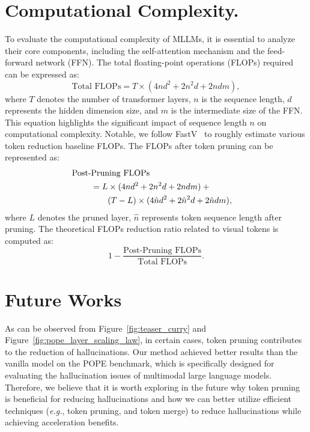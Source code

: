 \section{Computational Complexity.}
To evaluate the computational complexity of MLLMs, it is essential to analyze their core components, including the self-attention mechanism and the feed-forward network (FFN). The total floating-point operations (FLOPs) required can be expressed as:  
\begin{equation}
\text{Total FLOPs} = T \times (4nd^2 + 2n^2d + 2ndm),
\end{equation}  
where $T$ denotes the number of transformer layers, $n$ is the sequence length, $d$ represents the hidden dimension size, and $m$ is the intermediate size of the FFN.  
This equation highlights the significant impact of sequence length $n$ on computational complexity. 
Notable, we follow FastV~\cite{chen2024image} to roughly estimate various token reduction baseline FLOPs.
The FLOPs after token pruning can be represented as:
\begin{equation}
\begin{split}
    \text{Post-Pruning FLOPs} \\
    &\hspace{-7em}= L\times(4nd^2+2n^2d+2ndm) +{} \\
    &\hspace{-5em} (T-L) \times (4\hat{n}d^2+2\hat{n}^2d+2\hat{n}dm),
\end{split}
\end{equation}
where $L$ denotes the pruned layer, $\hat{n}$ represents token sequence length after pruning.
The theoretical FLOPs reduction ratio related to visual tokens is computed as:
\begin{equation}
    1-\frac{\text{Post-Pruning FLOPs}}{\text{Total FLOPs}}.
\end{equation}


\section{Future Works}
As can be observed from Figure~\ref{fig:teaser_curry} and Figure~\ref{fig:pope_layer_scaling_law}, in certain cases, token pruning contributes to the reduction of hallucinations. Our method achieved better results than the vanilla model on the POPE benchmark, which is specifically designed for evaluating the hallucination issues of multimodal large language models. Therefore, we believe that it is worth exploring in the future why token pruning is beneficial for reducing hallucinations and how we can better utilize efficient techniques (\emph{e.g.}, token pruning, and token merge) to reduce hallucinations while achieving acceleration benefits.

